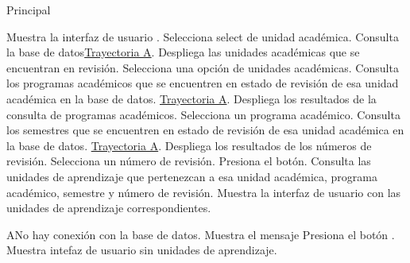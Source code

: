 \begin{UCtrayectoria}{Principal}


    \UCpaso Muestra la interfaz de usuario .
    \UCpaso [\UCactor] Selecciona select de unidad académica.
    \UCpaso Consulta la base de datos\hyperref[SP2-CU2-A]{Trayectoria A}.
    \UCpaso Despliega las unidades académicas que se encuentran en revisión.
    \UCpaso [\UCactor] Selecciona una opción de unidades académicas.
    \UCpaso Consulta los programas académicos que se encuentren en estado de revisión de esa unidad académica en la base de datos. \hyperref[SP2-CU2-A]{Trayectoria A}.
    \UCpaso Despliega los resultados de la consulta de programas académicos.
    \UCpaso [\UCactor] Selecciona un programa académico.
    \UCpaso Consulta los semestres que se encuentren en estado de revisión de esa unidad académica en la base de datos. \hyperref[SP2-CU2-A]{Trayectoria A}.
    \UCpaso Despliega los resultados de los números de revisión.
    \UCpaso [\UCactor] Selecciona un número de revisión.
    \UCpaso [\UCactor] Presiona el botón. 
    \UCpaso Consulta las unidades de aprendizaje que pertenezcan a esa unidad académica, programa académico, semestre y número de revisión.
    \UCpaso Muestra la interfaz de usuario  con las unidades de aprendizaje correspondientes.

\end{UCtrayectoria}


\label{SP2-CU2-A}
\begin{UCtrayectoriaA}{A}{No hay conexión con la base de datos.}
    \UCpaso Muestra el mensaje 
    \UCpaso[\UCactor] Presiona el botón .
    \UCpaso Muestra intefaz de usuario  sin unidades de aprendizaje.
\end{UCtrayectoriaA}



